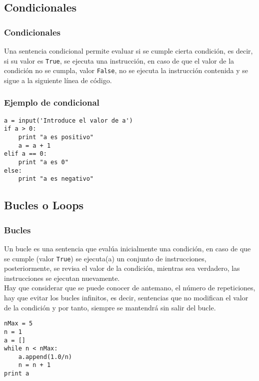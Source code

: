 \documentclass[12pt]{beamer}
\begin{document}
\subsection{Condicionales}
\begin{frame}
\frametitle{Condicionales}
Una sentencia condicional permite evaluar si se cumple cierta condici\'{o}n, es decir, si su valor es \texttt{True}, se ejecuta una instrucci\'{o}n, en caso de que el valor de la condici\'{o}n no se cumpla, valor \texttt{False}, no se ejecuta la instrucci\'{o}n contenida y se sigue a la siguiente l\'{i}nea de c\'{o}digo.
\end{frame}
\begin{frame}[fragile]
\frametitle{Ejemplo de condicional}
\begin{lstlisting}
a = input('Introduce el valor de a')
if a > 0:
    print "a es positivo"
    a = a + 1
elif a == 0: 
    print "a es 0"
else:
    print "a es negativo"
\end{lstlisting}
\end{frame}
\subsection{Bucles o Loops}
\begin{frame}
\frametitle{Bucles}
Un bucle es una sentencia que eval\'{u}a inicialmente una condici\'{o}n, en caso de que se cumple (valor \texttt{True}) se ejecuta(a) un conjunto de instrucciones, posteriormente, se revisa el valor de la condici\'{o}n, mientras sea verdadero, las instrucciones se ejecutan nuevamente.
\\
\bigskip
Hay que considerar que se puede conocer de antemano, el n\'{u}mero de repeticiones, hay que evitar los bucles infinitos, es decir, sentencias que no modifican el valor de la condici\'{o}n y por tanto, siempre se mantendr\'{a} sin salir del bucle.
\end{frame}
\begin{frame}[fragile]
\begin{lstlisting}
nMax = 5
n = 1
a = [] 
while n < nMax:
    a.append(1.0/n) 
    n = n + 1
print a
\end{lstlisting}
\end{frame}
\end{document}
